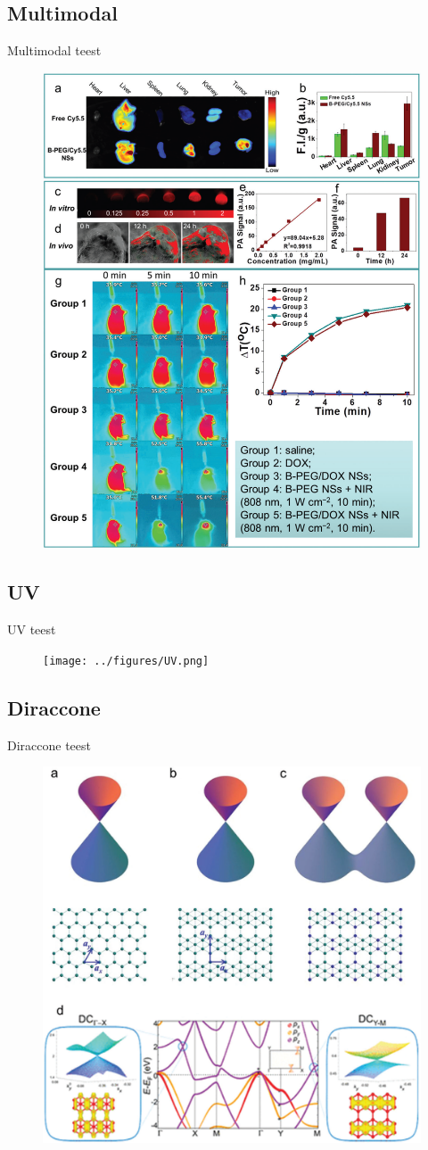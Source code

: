 \documentclass[handout,t]{beamer}
\begin{document}
\subsection{Multimodal}
\begin{frame}{Multimodal}
	teest
	\begin{figure}
		\centering
		\includegraphics[width=0.5\linewidth]{../figures/Multimodal.png}
		\label{fig:Multimodal}
	\end{figure}
\end{frame}
\subsection{UV}
\begin{frame}{UV}
	teest
	\begin{figure}
		\centering
		\texttt{[image: ../figures/UV.png]}
		\label{fig:UV}
	\end{figure}
\end{frame}
\subsection{Diraccone}
\begin{frame}{Diraccone}
	teest
	\begin{figure}
		\centering
		\includegraphics[width=0.5\linewidth]{../figures/Diraccone.png}
	\end{figure}
\end{frame}
\end{document}
